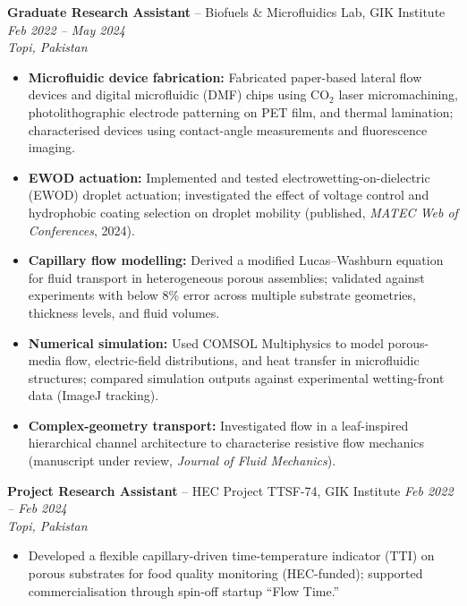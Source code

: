 \documentclass[11pt,a4paper]{article}
\begin{document}
\textbf{Graduate Research Assistant} -- Biofuels \& Microfluidics Lab, GIK
Institute \hfill \textit{Feb 2022 -- May 2024}\\
\textit{Topi, Pakistan}
\begin{itemize}
  \item \textbf{Microfluidic device fabrication:} Fabricated paper-based lateral
        flow devices and digital microfluidic (DMF) chips using CO$_2$ laser
        micromachining, photolithographic electrode patterning on PET film, and
        thermal lamination; characterised devices using contact-angle measurements
        and fluorescence imaging.
  \item \textbf{EWOD actuation:} Implemented and tested electrowetting-on-dielectric
        (EWOD) droplet actuation; investigated the effect of voltage control and
        hydrophobic coating selection on droplet mobility (published,
        \textit{MATEC Web of Conferences}, 2024).
  \item \textbf{Capillary flow modelling:} Derived a modified Lucas--Washburn
        equation for fluid transport in heterogeneous porous assemblies; validated
        against experiments with below 8\% error across multiple substrate
        geometries, thickness levels, and fluid volumes.
  \item \textbf{Numerical simulation:} Used COMSOL Multiphysics to model porous-media
        flow, electric-field distributions, and heat transfer in microfluidic
        structures; compared simulation outputs against experimental wetting-front
        data (ImageJ tracking).
  \item \textbf{Complex-geometry transport:} Investigated flow in a leaf-inspired
        hierarchical channel architecture to characterise resistive flow mechanics
        (manuscript under review, \textit{Journal of Fluid Mechanics}).
\end{itemize}

\vspace{4pt}
\textbf{Project Research Assistant} -- HEC Project TTSF-74, GIK Institute
\hfill \textit{Feb 2022 -- Feb 2024}\\
\textit{Topi, Pakistan}
\begin{itemize}
  \item Developed a flexible capillary-driven time-temperature indicator (TTI) on
        porous substrates for food quality monitoring (HEC-funded); supported
        commercialisation through spin-off startup ``Flow Time.''
\end{itemize}
\end{document}
